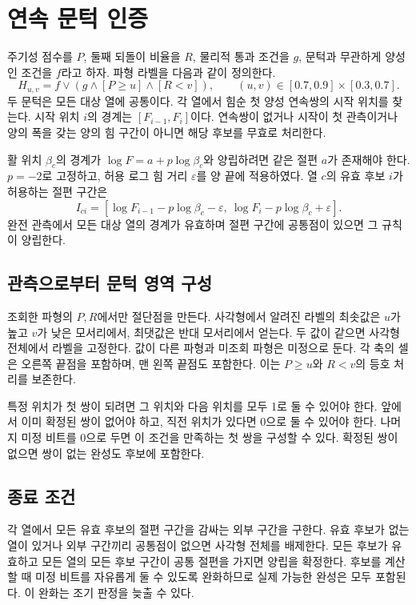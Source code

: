 \documentclass[11pt,a4paper]{article}
\begin{document}
\clearpage
\section{연속 문턱 인증}
주기성 점수를 \(P\), 둘째 되돌이 비율을 \(R\), 물리적 통과 조건을 \(g\), 문턱과 무관하게 양성인 조건을 \(f\)라고 하자. 파형 라벨을 다음과 같이 정의한다.
\begin{equation}
H_{u,v}=f\lor(g\land[P\ge u]\land[R<v]),
\qquad (u,v)\in[0.7,0.9]\times[0.3,0.7].
\end{equation}
두 문턱은 모든 대상 열에 공통이다. 각 열에서 힘순 첫 양성 연속쌍의 시작 위치를 찾는다. 시작 위치 \(i\)의 경계는 \([F_{i-1},F_i]\)이다. 연속쌍이 없거나 시작이 첫 관측이거나 양의 폭을 갖는 양의 힘 구간이 아니면 해당 후보를 무효로 처리한다.

활 위치 \(\beta_c\)의 경계가 \(\log F=a+p\log\beta_c\)와 양립하려면 같은 절편 \(a\)가 존재해야 한다. \(p=-2\)로 고정하고, 허용 로그 힘 거리 \(\varepsilon\)를 양 끝에 적용하였다. 열 \(c\)의 유효 후보 \(i\)가 허용하는 절편 구간은
\begin{equation}
I_{ci}=[\log F_{i-1}-p\log\beta_c-\varepsilon,\
          \log F_i-p\log\beta_c+\varepsilon].
\end{equation}
완전 관측에서 모든 대상 열의 경계가 유효하며 절편 구간에 공통점이 있으면 그 규칙이 양립한다.

\subsection*{관측으로부터 문턱 영역 구성}
조회한 파형의 \(P,R\)에서만 절단점을 만든다. 사각형에서 알려진 라벨의 최솟값은 \(u\)가 높고 \(v\)가 낮은 모서리에서, 최댓값은 반대 모서리에서 얻는다. 두 값이 같으면 사각형 전체에서 라벨을 고정한다. 값이 다른 파형과 미조회 파형은 미정으로 둔다. 각 축의 셀은 오른쪽 끝점을 포함하며, 맨 왼쪽 끝점도 포함한다. 이는 \(P\ge u\)와 \(R<v\)의 등호 처리를 보존한다.

특정 위치가 첫 쌍이 되려면 그 위치와 다음 위치를 모두 1로 둘 수 있어야 한다. 앞에서 이미 확정된 쌍이 없어야 하고, 직전 위치가 있다면 0으로 둘 수 있어야 한다. 나머지 미정 비트를 0으로 두면 이 조건을 만족하는 첫 쌍을 구성할 수 있다. 확정된 쌍이 없으면 쌍이 없는 완성도 후보에 포함한다.

\subsection*{종료 조건}
각 열에서 모든 유효 후보의 절편 구간을 감싸는 외부 구간을 구한다. 유효 후보가 없는 열이 있거나 외부 구간끼리 공통점이 없으면 사각형 전체를 배제한다. 모든 후보가 유효하고 모든 열의 모든 후보 구간이 공통 절편을 가지면 양립을 확정한다. 후보를 계산할 때 미정 비트를 자유롭게 둘 수 있도록 완화하므로 실제 가능한 완성은 모두 포함된다. 이 완화는 조기 판정을 늦출 수 있다.
\end{document}
